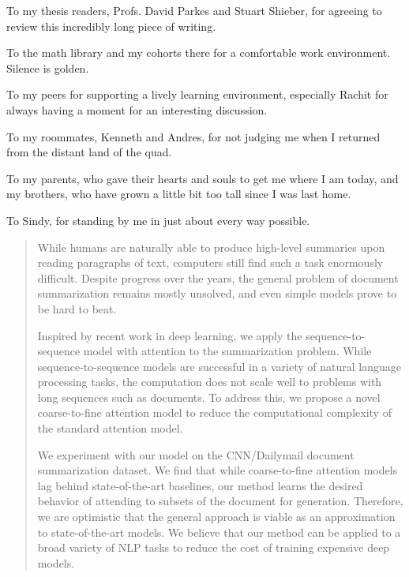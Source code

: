 \documentclass[12pt]{report}
\begin{document}
To my thesis readers, Profs. David Parkes and Stuart Shieber, for agreeing to review this incredibly long piece of writing.

To the math library and my cohorts there for a comfortable work environment. Silence is golden.

To my peers for supporting a lively learning environment, especially Rachit for always having a moment for an interesting discussion.

To my roommates, Kenneth and Andres, for not judging me when I returned from the distant land of the quad.

To my parents, who gave their hearts and souls to get me where I am today, and my brothers, who have grown a little bit too tall since I was last home.

To Sindy, for standing by me in just about every way possible.


\clearpage %


\begin{abstract} %
While humans are naturally able to produce high-level summaries upon reading paragraphs of text, computers still find such a task enormously difficult. Despite progress over the years, the general problem of document summarization remains mostly unsolved, and even simple models prove to be hard to beat.

Inspired by recent work in deep learning, we apply the sequence-to-sequence model with attention to the summarization problem. While sequence-to-sequence models are successful in a variety of natural language processing tasks, the computation does not scale well to problems with long sequences such as documents. To address this, we propose a novel coarse-to-fine attention model to reduce the computational complexity of the standard attention model.

We experiment with our model on the CNN/Dailymail document summarization dataset. We find that while coarse-to-fine attention models lag behind state-of-the-art baselines, our method learns the desired behavior of attending to subsets of the document for generation.
Therefore, we are optimistic that the general approach is viable as an approximation to state-of-the-art models. We believe that our method can be applied to a broad variety of NLP tasks to reduce the cost of training expensive deep models.
\end{abstract}
\end{document}
